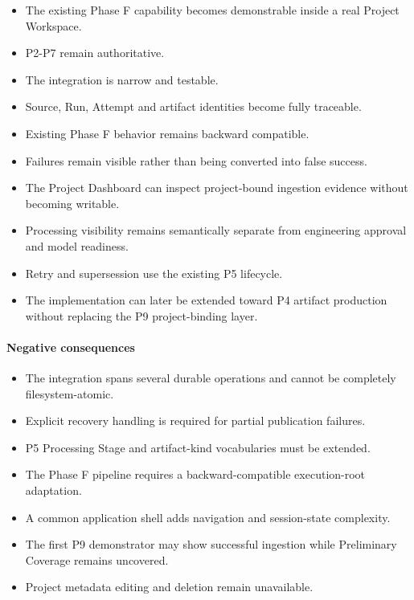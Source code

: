 \begin{itemize}
\tightlist
\item
  The existing Phase F capability becomes demonstrable inside a real Project Workspace.
\item
  P2-P7 remain authoritative.
\item
  The integration is narrow and testable.
\item
  Source, Run, Attempt and artifact identities become fully traceable.
\item
  Existing Phase F behavior remains backward compatible.
\item
  Failures remain visible rather than being converted into false success.
\item
  The Project Dashboard can inspect project-bound ingestion evidence without becoming writable.
\item
  Processing visibility remains semantically separate from engineering approval and model readiness.
\item
  Retry and supersession use the existing P5 lifecycle.
\item
  The implementation can later be extended toward P4 artifact production without replacing the P9 project-binding layer.
\end{itemize}

\hypertarget{negative-consequences}{%
\paragraph{Negative consequences}\label{negative-consequences}}

\begin{itemize}
\tightlist
\item
  The integration spans several durable operations and cannot be completely filesystem-atomic.
\item
  Explicit recovery handling is required for partial publication failures.
\item
  P5 Processing Stage and artifact-kind vocabularies must be extended.
\item
  The Phase F pipeline requires a backward-compatible execution-root adaptation.
\item
  A common application shell adds navigation and session-state complexity.
\item
  The first P9 demonstrator may show successful ingestion while Preliminary Coverage remains uncovered.
\item
  Project metadata editing and deletion remain unavailable.
\end{itemize}

